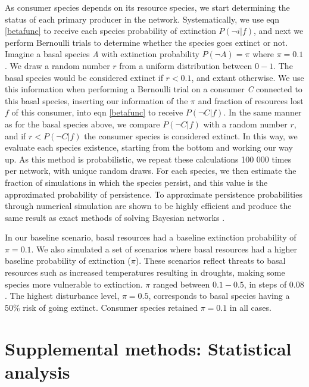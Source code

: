 \documentclass[12pt]{article}
\begin{document}
\begin{spacing}{2.0}
        As consumer species depends on its resource species, we start determining the status of each primary producer in the network.
        Systematically, we use eqn \ref{betafunc} to receive each species probability of extinction $P(\lnot i|f)$, and next we perform Bernoulli trials to determine whether the species goes extinct or not. 
        Imagine a basal species \textit{A} with extinction probability $P(\lnot A) = \pi$ where $\pi = 0.1$. We draw a random number $r$ from a uniform distribution between $0-1$. The basal species would be considered extinct if $r < 0.1$, and extant otherwise. 
        We use this information when performing a Bernoulli trial on a consumer \textit{C} connected to this basal species, inserting our information of the $\pi$ and fraction of resources lost $f$ of this consumer, into eqn \ref{betafunc} to 
        receive $P(\lnot C|f)$. In the same manner as for the basal species above, we compare $P(\lnot C|f)$ with a random number $r$, and if $r < P(\lnot C|f)$ the consumer species is considered extinct. 
        In this way, we evaluate each species existence, starting from the bottom and working our way up.
        As this method is probabilistic, we repeat these calculations 100 000 times per network, with unique random draws.
        For each species, we then estimate the fraction of simulations in which the species persist, and this value is the approximated probability of persistence.
        To approximate persistence probabilities through numerical simulation are shown to be highly efficient and produce the same result as exact methods of solving Bayesian networks \citep{Haussler2020}.
        

        In our baseline scenario, basal resources had a baseline extinction probability of $\pi = 0.1$. 
        We also simulated a set of scenarios where basal resources had a higher baseline probability of extinction ($\pi$). 
        These scenarios reflect threats to basal resources such as increased temperatures resulting in droughts, making some species more vulnerable to extinction.
        $\pi$ ranged between $0.1-0.5$, in steps of $0.08$. 
        The highest disturbance level, $\pi = 0.5$, corresponds to basal species having a 50\% risk of going extinct. 
        Consumer species retained $\pi=0.1$ in all cases.
        
\clearpage
        
\section{Supplemental methods: Statistical analysis}


\end{spacing}
\end{document}
